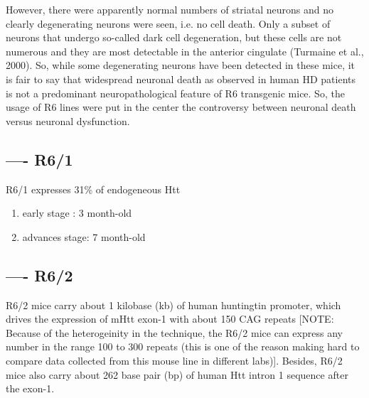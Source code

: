 However, there were apparently normal numbers of striatal neurons and no clearly
degenerating neurons were seen, i.e. no cell death. Only a subset of neurons
that undergo so-called dark cell degeneration, but these cells are not numerous
and they are most detectable in the anterior cingulate (Turmaine et al., 2000).
So, while some degenerating neurons have been detected in these mice, it is fair
to say that widespread neuronal death as observed in human HD patients is not a
predominant neuropathological feature of R6 transgenic mice.
So, the usage of R6 lines were put in the center the controversy between
neuronal death versus neuronal dysfunction.

\subsection{---- R6/1}
\label{sec:mouse-R6/1}

R6/1 expresses 31\% of endogeneous Htt 
\begin{enumerate}
  \item early stage : 3 month-old
  \item advances stage: 7 month-old
\end{enumerate}

\subsection{---- R6/2}
\label{sec:mouse-R6/2}

R6/2 mice carry about 1 kilobase (kb) of human huntingtin promoter, which drives
the expression of mHtt exon-1 with about 150 CAG repeats [NOTE: Because of the
heterogeinity in the technique, the R6/2 mice can express any number in the
range 100 to 300 repeats (this is one of the reason making hard to compare data
collected from this mouse line in different labs)].
Besides, R6/2 mice also carry about 262 base pair (bp) of human Htt intron 1
sequence after the exon-1.

